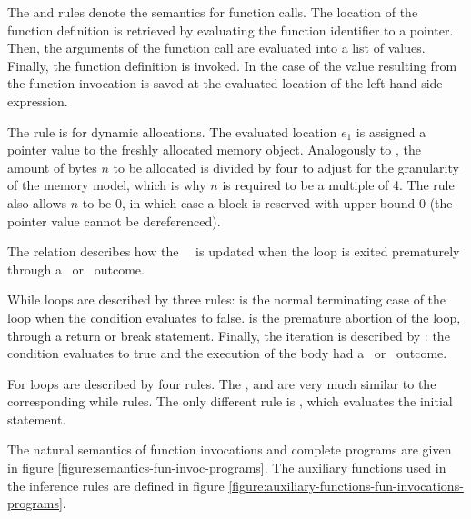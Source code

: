The  and  rules denote the semantics for function calls.
The location of the function definition is retrieved by evaluating the function identifier to a pointer.
Then, the arguments of the function call are evaluated into a list of values.
Finally, the function definition is invoked.
In the case of  the value resulting from the function invocation is saved at the
evaluated location of the left-hand side expression.

The  rule is for dynamic allocations.
The evaluated location $e_1$ is assigned a pointer value to the freshly allocated memory object.
Analogously to , the amount of bytes $n$ to be allocated is divided by four to adjust
for the granularity of the memory model, which is why $n$ is required to be a multiple of 4.
The rule also allows $n$ to be 0, in which case a block is reserved with upper bound 0 (\ie the pointer value cannot be dereferenced).

The \Outcomeupdate{}{} relation describes how the \Outcome \ \Outcomevar \ is updated when the loop is exited prematurely
through a \obreak \ or \oreturn \ outcome.

While loops are described by three rules:  is the
normal terminating case of the loop when the condition evaluates to false.
 is the premature abortion of the loop, through a return or break statement.
Finally, the iteration is described by : the condition evaluates to 
true and the execution of the body had a \onormal \ or \ocontinue \ outcome.

For loops are described by four rules.
The ,  and 
are very much similar to the corresponding while rules.
The only different rule is  , which evaluates the initial
statement.

The natural semantics of function invocations and complete programs are given in figure \ref{figure:semantics-fun-invoc-programs}.
The auxiliary functions used in the inference rules are defined in figure \ref{figure:auxiliary-functions-fun-invocations-programs}.

